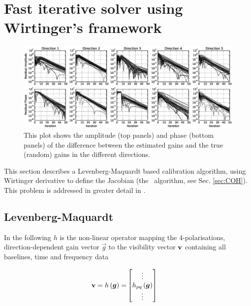 \section{Fast iterative solver using Wirtinger's framework}
\label{sec:Solver}

\begin{figure}[t!]
\begin{center}
\includegraphics[width=\textwidth]{ConvergenceLog.eps}
\caption{\label{fig:Convergence} This plot shows the amplitude (top
  panels) and
  phase (bottom panels) of the difference between
  the estimated gains and the true (random) gains in the different directions.}
\end{center}
\end{figure}

This section describes a Levenberg-Maquardt based calibration algorithm, using
Wirtinger derivative to define the Jacobian (the \COH~algorithm, see
Sec. \ref{sec:COH}). This problem is addressed in greater detail in \citet[][]{SmirnovTasse14}.

\subsection{Levenberg-Maquardt}

In the following $h$ is the non-linear operator mapping the
4-polarisations, direction-dependent gain vector $\vec{g}$ to the
visibility vector $\textbf{v}$ containing all baselines, time and frequency
data

\begin{alignat}{2}
\vis=h\left(\vec{g}\right)=&
\begin{bmatrix} 
\vdots \\ 
h_{pq}\left(\vec{g}\right)\\ 
\vdots \\ 
\end{bmatrix}
\end{alignat}


